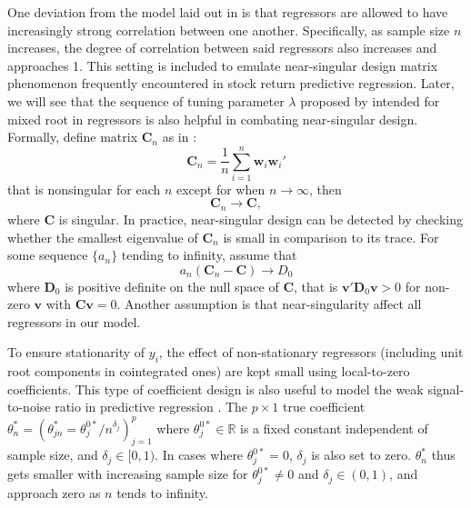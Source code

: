 \documentclass[12pt,a4paper]{article}
\begin{document}
One deviation from the model laid out in \cite{lee2018lasso} is that regressors are allowed to have increasingly strong correlation between one another. Specifically, as sample size $ n $ increases, the degree of correlation between said regressors also increases and approaches 1. This setting is included to emulate near-singular design matrix phenomenon frequently encountered in stock return predictive regression. Later, we will see that the sequence of tuning parameter $ \lambda $ proposed by \cite{lee2018lasso} intended for mixed root in regressors is also helpful in combating near-singular design. Formally, define matrix $ \bm{C}_n $ as in \cite{knight2008shrinkage}:
\begin{equation}\label{eq:2}
	\bm{C}_n = \frac{1}{n}\sum_{i = 1}^{n}\bm{w}_i \bm{w}_i'
\end{equation}
that is nonsingular for each $ n $ except for when $ n \rightarrow \infty $, then 
\begin{equation}\label{eq:3}
	\bm{C}_n \rightarrow \bm{C},
\end{equation}
where $ \bm{C} $ is singular. In practice, near-singular design can be detected by checking whether the smallest eigenvalue of $ \bm{C}_n $ is small in comparison to its trace. 
For some sequence $ \{a_n\}$ tending to infinity, assume that
\begin{equation}\label{eq:4}
	a_n(\bm{C}_n - \bm{C}) \rightarrow D_0
\end{equation}
where $ \bm{D}_0 $ is positive definite on the null space of $ \bm{C} $, that is $ \bm{v}'\bm{D}_0\bm{v} > 0 $ for non-zero $ \bm{v} $ with $ \bm{C}\bm{v} = 0 $.
Another assumption is that near-singularity affect all regressors in our model.

To ensure stationarity of $ y_i $, the effect of non-stationary regressors (including unit root components in cointegrated ones) are kept small using local-to-zero coefficients. This type of coefficient design is also useful to model the weak signal-to-noise ratio in predictive regression \citep{phillips2013predictive, lee2018lasso}. The $ p \times 1$ true coefficient $ \theta^*_n = (\theta^*_{jn} = \theta^{0*}_j/n^{\delta_j})^p_{j = 1} $ where $ \theta^{0*}_j \in \mathbb{R} $ is a fixed constant independent of sample size, and $ \delta_j \in [0, 1) $. In cases where $ \theta^{0*}_j = 0 $,  $ \delta_j $ is also set to zero. $ \theta^*_n $ thus gets smaller with increasing sample size for $ \theta^{0*}_j \neq 0 $ and $ \delta_j \in (0, 1) $, and approach zero as $ n $ tends to infinity.
\end{document}
